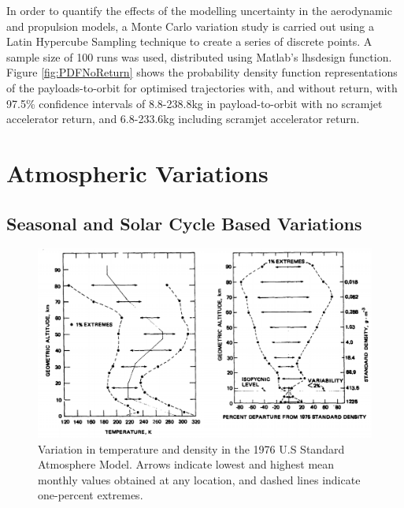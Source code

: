 In order to quantify the effects of the modelling uncertainty in the aerodynamic and propulsion models, a Monte Carlo variation study is carried out using a Latin Hypercube Sampling technique to create a series of discrete points. A sample size of 100 runs was used, distributed using Matlab's \textsf{lhsdesign} function. Figure \ref{fig:PDFNoReturn} shows the probability density function representations of the payloads-to-orbit for optimised trajectories with, and without return, with 97.5\% confidence intervals of 8.8-238.8kg in payload-to-orbit with no scramjet accelerator return, and 6.8-233.6kg including scramjet accelerator return. 



\section{Atmospheric Variations}
\subsection{Seasonal and Solar Cycle Based Variations}

\begin{figure}[ht]
	\centering
	\includegraphics[width=0.8\linewidth]{figures/A1_uncertainty-analysis/AtmosphericVariation}
	\caption{Variation in temperature and density in the 1976 U.S Standard Atmosphere Model\cite{Administration1976}. Arrows indicate lowest and highest mean monthly values obtained at any location, and dashed lines indicate one-percent extremes.}
	\label{fig:AtmosphericVariation}
\end{figure}

